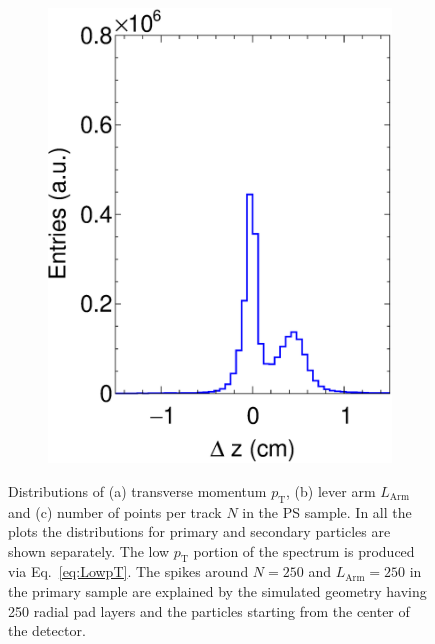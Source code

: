 \begin{figure}[t]
\begin{subfigure}[b]{0.32\textwidth}
         \includegraphics[width=\textwidth]{figures/ch5-KF_NDGAr/FullSample/Int/Props/ResZ.eps}
         \caption{}
         \label{fig:TPCZRes_Int}
     \end{subfigure}
        \caption{Distributions of (a) transverse momentum $p_{\textrm{T}}$,  (b) lever arm $L_{\textrm{Arm}}$ and (c) number of points per track $N$ in the PS sample. In all the plots the distributions for primary and secondary particles are shown separately. The low $p_{\textrm{T}}$ portion of the spectrum is produced via Eq.~\ref{eq:LowpT}. The spikes around $N=250$ and $L_{\textrm{Arm}}=250$ in the primary sample are explained by the simulated geometry having 250 radial pad layers and the particles starting from the center of the detector. } \label{fig:TPCPosRes_Int}
\end{figure}

